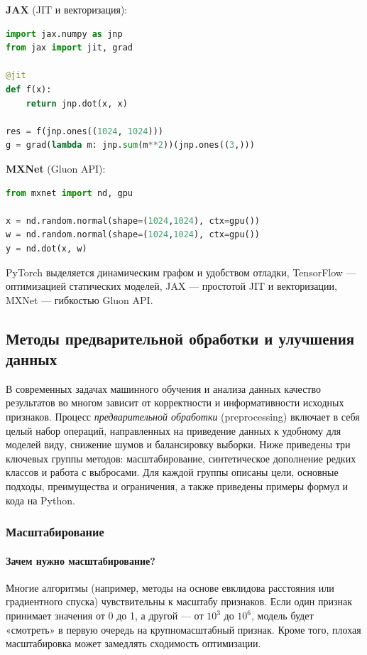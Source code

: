 \textbf{JAX} (JIT и векторизация):
\begin{lstlisting}[language=Python,caption={JAX: JIT-компиляция и градиент},label={lst:jax}]
import jax.numpy as jnp
from jax import jit, grad

@jit
def f(x):
    return jnp.dot(x, x)

res = f(jnp.ones((1024, 1024)))
g = grad(lambda m: jnp.sum(m**2))(jnp.ones((3,)))
\end{lstlisting}

\textbf{MXNet} (Gluon API):
\begin{lstlisting}[language=Python,caption={MXNet: dot-операция на GPU},label={lst:mxnet}]
from mxnet import nd, gpu

x = nd.random.normal(shape=(1024,1024), ctx=gpu())
w = nd.random.normal(shape=(1024,1024), ctx=gpu())
y = nd.dot(x, w)
\end{lstlisting}

PyTorch выделяется динамическим графом и удобством отладки, TensorFlow — оптимизацией статических моделей, JAX — простотой JIT и векторизации, MXNet — гибкостью Gluon API.

\subsection{Методы предварительной обработки и улучшения данных}

В современных задачах машинного обучения и анализа данных качество результатов во многом зависит от корректности и информативности исходных признаков. Процесс \emph{предварительной обработки} (preprocessing) включает в себя целый набор операций, направленных на приведение данных к удобному для моделей виду, снижение шумов и балансировку выборки. Ниже приведены три ключевых группы методов: масштабирование, синтетическое дополнение редких классов и работа с выбросами. Для каждой группы описаны цели, основные подходы, преимущества и ограничения, а также приведены примеры формул и кода на Python.

\subsubsection{Масштабирование}
\label{sec:scaling}

\paragraph{Зачем нужно масштабирование?}  
Многие алгоритмы (например, методы на основе евклидова расстояния или градиентного спуска) чувствительны к масштабу признаков. Если один признак принимает значения от 0 до 1, а другой — от \(10^3\) до \(10^6\), модель будет «смотреть» в первую очередь на крупномасштабный признак. Кроме того, плохая масштабировка может замедлять сходимость оптимизации.

